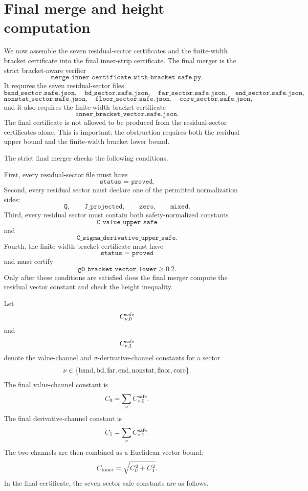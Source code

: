 \documentclass[11pt]{article}
\newcommand{\sig}{\sigma}
\newcommand{\Czero}{C_0}
\newcommand{\Cone}{C_1}
\newcommand{\Cinner}{C_{\rm inner}}
\newcommand{\JSON}[1]{\texttt{#1}}
\newcommand{\code}[1]{\texttt{#1}}
\newcommand{\Qside}{\texttt{Q}}
\newcommand{\Jproj}{\texttt{J\_projected}}
\newcommand{\Zeroside}{\texttt{zero}}
\newcommand{\Mixedside}{\texttt{mixed}}
\begin{document}
\section{Final merge and height computation}

We now assemble the seven residual-sector certificates and the finite-width
bracket certificate into the final inner-strip certificate.  The final merger is
the strict bracket-aware verifier
\[
        \code{merge\_inner\_certificate\_with\_bracket\_safe.py}.
\]
It requires the seven residual-sector files
\[
        \code{band\_sector.safe.json},
        \quad
        \code{bd\_sector.safe.json},
        \quad
        \code{far\_sector.safe.json},
        \quad
        \code{end\_sector.safe.json},
\]
\[
        \code{nonstat\_sector.safe.json},
        \quad
        \code{floor\_sector.safe.json},
        \quad
        \code{core\_sector.safe.json},
\]
and it also requires the finite-width bracket certificate
\[
        \code{inner\_bracket\_vector.safe.json}.
\]
The final certificate is not allowed to be produced from the residual-sector
certificates alone.  This is important: the obstruction requires both the
residual upper bound and the finite-width bracket lower bound.

The strict final merger checks the following conditions.

First, every residual-sector file must have
\[
        \JSON{status = proved}.
\]
Second, every residual sector must declare one of the permitted normalization
sides:
\[
        \Qside,
        \qquad
        \Jproj,
        \qquad
        \Zeroside,
        \qquad
        \Mixedside.
\]
Third, every residual sector must contain both safety-normalized constants
\[
        \JSON{C\_value\_upper\_safe}
\]
and
\[
        \JSON{C\_sigma\_derivative\_upper\_safe}.
\]
Fourth, the finite-width bracket certificate must have
\[
        \JSON{status = proved}
\]
and must certify
\[
        \JSON{g0\_bracket\_vector\_lower}\ge0.2.
\]
Only after these conditions are satisfied does the final merger compute the
residual vector constant and check the height inequality.

Let
\[
        C_{\nu,0}^{\rm safe}
\]
and
\[
        C_{\nu,1}^{\rm safe}
\]
denote the value-channel and \(\sig\)-derivative-channel constants for a
sector
\[
        \nu\in
        \{
        {\rm band},
        {\rm bd},
        {\rm far},
        {\rm end},
        {\rm nonstat},
        {\rm floor},
        {\rm core}
        \}.
\]
The final value-channel constant is
\[
        \Czero
        =
        \sum_\nu C_{\nu,0}^{\rm safe}.
\]
The final derivative-channel constant is
\[
        \Cone
        =
        \sum_\nu C_{\nu,1}^{\rm safe}.
\]
The two channels are then combined as a Euclidean vector bound:
\[
        \Cinner
        =
        \sqrt{\Czero^2+\Cone^2}.
\]
In the final certificate, the seven sector safe constants are as follows.
\end{document}
